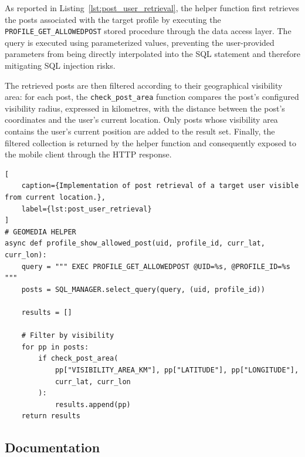As reported in Listing~\ref{lst:post_user_retrieval}, the helper function first retrieves the posts associated with the target profile by executing the \texttt{PROFILE\_GET\_ALLOWEDPOST} stored procedure through the data access layer. The query is executed using parameterized values, preventing the user-provided parameters from being directly interpolated into the SQL statement and therefore mitigating SQL injection risks.

The retrieved posts are then filtered according to their geographical visibility area: for each post, the \texttt{check\_post\_area} function compares the post's configured visibility radius, expressed in kilometres, with the distance between the post's coordinates and the user's current location. Only posts whose visibility area contains the user's current position are added to the result set. Finally, the filtered collection is returned by the helper function and consequently exposed to the mobile client through the HTTP response.



\begin{lstlisting}[
    caption={Implementation of post retrieval of a target user visible from current location.},
    label={lst:post_user_retrieval}
]
# GEOMEDIA HELPER
async def profile_show_allowed_post(uid, profile_id, curr_lat, curr_lon):
    query = """ EXEC PROFILE_GET_ALLOWEDPOST @UID=%s, @PROFILE_ID=%s """
    posts = SQL_MANAGER.select_query(query, (uid, profile_id))

    results = []

    # Filter by visibility
    for pp in posts:
        if check_post_area(
            pp["VISIBILITY_AREA_KM"], pp["LATITUDE"], pp["LONGITUDE"],
            curr_lat, curr_lon
        ):
            results.append(pp)
    return results
\end{lstlisting}



\subsection{Documentation}

